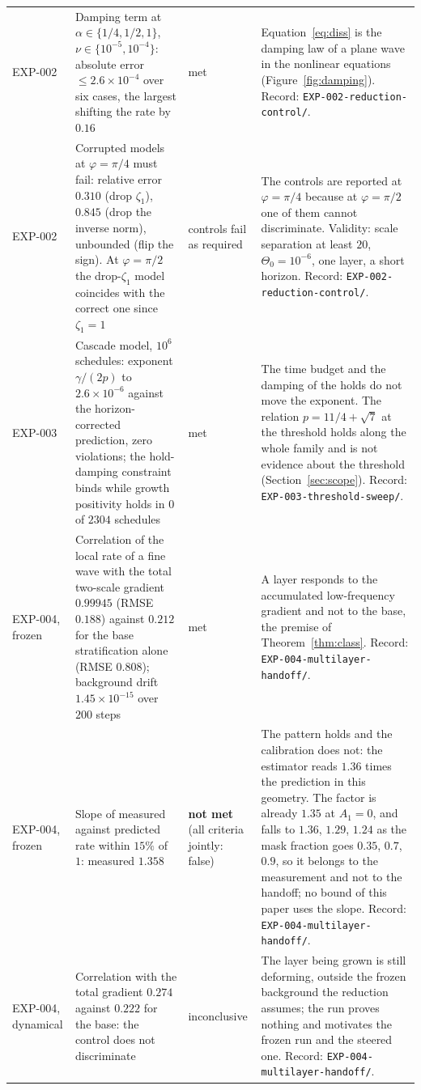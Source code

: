 \documentclass[11pt]{article}
\theoremstyle{remark}
\newcommand{\fp}[1]{\nolinkurl{#1}}
\begin{document}
\begin{longtable}{@{}L{1.45cm}L{5.9cm}L{1.85cm}L{5.0cm}@{}}
EXP-002 & Damping term at $\alpha\in\{1/4,1/2,1\}$, $\nu\in\{10^{-5},10^{-4}\}$: absolute error $\le2.6\times10^{-4}$ over six cases, the largest shifting the rate by $0.16$ & met & Equation~\eqref{eq:diss} is the damping law of a plane wave in the nonlinear equations (Figure~\ref{fig:damping}). Record: \fp{EXP-002-reduction-control/}. \\
EXP-002 & Corrupted models at $\varphi=\pi/4$ must fail: relative error $0.310$ (drop $\zeta_{1}$), $0.845$ (drop the inverse norm), unbounded (flip the sign). At $\varphi=\pi/2$ the drop-$\zeta_{1}$ model coincides with the correct one since $\zeta_{1}=1$ & controls fail as required & The controls are reported at $\varphi=\pi/4$ because at $\varphi=\pi/2$ one of them cannot discriminate. Validity: scale separation at least $20$, $\Theta_{0}=10^{-6}$, one layer, a short horizon. Record: \fp{EXP-002-reduction-control/}. \\
EXP-003 & Cascade model, $10^{6}$ schedules: exponent $\gamma/(2p)$ to $2.6\times10^{-6}$ against the horizon-corrected prediction, zero violations; the hold-damping constraint binds while growth positivity holds in $0$ of $2304$ schedules & met & The time budget and the damping of the holds do not move the exponent. The relation $p=11/4+\sqrt7$ at the threshold holds along the whole family and is not evidence about the threshold (Section~\ref{sec:scope}). Record: \fp{EXP-003-threshold-sweep/}. \\
EXP-004, frozen & Correlation of the local rate of a fine wave with the total two-scale gradient $0.99945$ (RMSE $0.188$) against $0.212$ for the base stratification alone (RMSE $0.808$); background drift $1.45\times10^{-15}$ over $200$ steps & met & A layer responds to the accumulated low-frequency gradient and not to the base, the premise of Theorem~\ref{thm:class}. Record: \fp{EXP-004-multilayer-handoff/}. \\
EXP-004, frozen & Slope of measured against predicted rate within $15\%$ of $1$: measured $1.358$ & \textbf{not met} (all criteria jointly: false) &
The pattern holds and the calibration does not: the estimator reads $1.36$ times the prediction in this geometry. The factor is already $1.35$ at $A_{1}=0$, and falls to $1.36$, $1.29$, $1.24$ as the mask fraction goes $0.35$, $0.7$, $0.9$, so it belongs to the measurement and not to the handoff; no bound of this paper uses the slope. Record: \fp{EXP-004-multilayer-handoff/}. \\
EXP-004, dynamical & Correlation with the total gradient $0.274$ against $0.222$ for the base: the control does not discriminate & inconclusive & The layer being grown is still deforming, outside the frozen background the reduction assumes; the run proves nothing and motivates the frozen run and the steered one. Record: \fp{EXP-004-multilayer-handoff/}. \\

\end{longtable}
\end{document}
